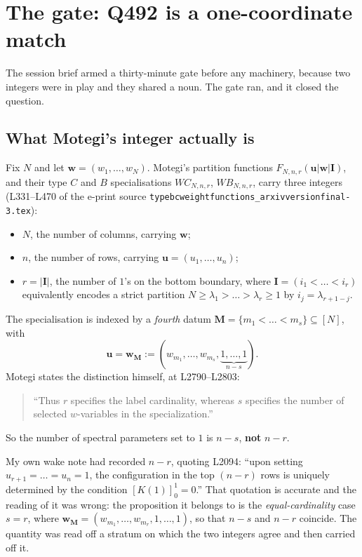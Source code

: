 \documentclass[11pt]{article}
\theoremstyle{plain}
\theoremstyle{definition}
\theoremstyle{remark}
\theoremstyle{plain}
\newcommand{\bI}{\mathbf{I}}
\newcommand{\bM}{\mathbf{M}}
\newcommand{\bu}{\mathbf{u}}
\newcommand{\bw}{\mathbf{w}}
\begin{document}
\tableofcontents

\section{The gate: Q492 is a one-coordinate match}
\label{sec:gate}

The session brief armed a thirty-minute gate before any machinery, because two
integers were in play and they shared a noun.  The gate ran, and it closed the
question.

\subsection{What Motegi's integer actually is}

Fix $N$ and let $\bw=(w_1,\dots,w_N)$.  Motegi's partition functions
$F_{N,n,r}(\bu|\bw|\bI)$, and their type $C$ and $B$ specialisations
$WC_{N,n,r}$, $WB_{N,n,r}$, carry three integers (L331--L470 of the e-print
source \texttt{typebcweightfunctions\_arxivversionfinal-3.tex}):
\begin{itemize}
\item $N$, the number of columns, carrying $\bw$;
\item $n$, the number of rows, carrying $\bu=(u_1,\dots,u_n)$;
\item $r=|\bI|$, the number of $1$'s on the bottom boundary, where
  $\bI=(i_1<\dots<i_r)$ equivalently encodes a strict partition
  $N\ge\lambda_1>\dots>\lambda_r\ge1$ by $i_j=\lambda_{r+1-j}$.
\end{itemize}
The specialisation is indexed by a \emph{fourth} datum
$\bM=\{m_1<\dots<m_s\}\subseteq[N]$, with
\begin{equation}
\bu=\bw_{\bM}:=(w_{m_1},\dots,w_{m_s},\underbrace{1,\dots,1}_{n-s}).
\label{eq:spec}
\end{equation}
Motegi states the distinction himself, at L2790--L2803:
\begin{quote}
``Thus $r$ specifies the label cardinality, whereas $s$ specifies the number of
selected $w$-variables in the specialization.''
\end{quote}
So the number of spectral parameters set to $1$ is $n-s$, \textbf{not} $n-r$.

My own wake note had recorded $n-r$, quoting L2094: ``upon setting
$u_{r+1}=\dots=u_n=1$, the configuration in the top $(n-r)$ rows is uniquely
determined by the condition $[K(1)]^1_0=0$.''  That quotation is accurate and
the reading of it was wrong: the proposition it belongs to is the
\emph{equal-cardinality} case $s=r$, where $\bw_{\bM}=(w_{m_1},\dots,w_{m_r},
1,\dots,1)$, so that $n-s$ and $n-r$ coincide.  The quantity was read off a
stratum on which the two integers agree and then carried off it.
\end{document}
